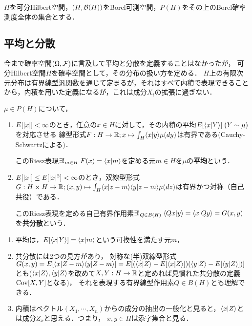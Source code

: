 \documentclass[uplatex,dvipdfmx]{jsreport}
\begin{document}
\begin{notation}
    $H$を可分Hilbert空間，$(H,\mathcal{B}(H))$をBorel可測空間，$P(H)$をその上のBorel確率測度全体の集合とする．
\end{notation}

\subsection{平均と分散}

\begin{tcolorbox}[colframe=ForestGreen, colback=ForestGreen!10!white,breakable,colbacktitle=ForestGreen!40!white,coltitle=black,fonttitle=\bfseries\sffamily,
title=]
    今まで確率空間$(\Omega,\mathcal{F})$に言及して平均と分散を定義することはなかったが，
    可分Hilbert空間$H$を確率空間として，その分布の扱い方を定める．
    $H$上の有限次元分布は有界線型汎関数を通じて定まるが，それはすべて内積で表現できることから，内積を用いた定義になるが，これは成分$X_i$の拡張に過ぎない．
\end{tcolorbox}

\begin{definition}
    $\mu\in P(H)$について，
    \begin{enumerate}
        \item $E[\lvert x\rvert]<\infty$のとき，任意の$x\in H$に対して，その内積の平均$E[\langle x|Y\rangle]\;(Y\sim\mu)$を対応させる
        線型形式$F:H\to\mathbb{R};x\mapsto\int_H\langle x|y\rangle\mu(dy)$は有界である(Cauchy-Schwartzによる)．
        
        このRiesz表現$\exists!_{m\in H}\;F(x)=\langle x|m\rangle$を定める元$m\in H$を$\mu$の\textbf{平均}という．
        \item $E[\lvert x\rvert]\le E[\lvert x\rvert^2]<\infty$のとき，双線型形式$G:H\times H\to\mathbb{R};(x,y)\mapsto\int_H\langle x|z-m\rangle\langle y|z-m\rangle\mu(dz)$は有界かつ対称（自己共役）である．
        
        このRiesz表現を定める自己有界作用素$\exists!_{Q\in B(H)}\;\langle Qx|y\rangle=\langle x|Qy\rangle=G(x,y)$を\textbf{共分散}という．
    \end{enumerate}
\end{definition}
\begin{remarks}\mbox{}
    \begin{enumerate}
        \item 平均は，$E[\langle x|Y\rangle]=\langle x|m\rangle$という可換性を満たす元$m$，
        \item 共分散には2つの見方があり，
        対称な(半)双線型形式$G(x,y)=E[\langle x|Z-m\rangle\langle y|Z-m\rangle]=E[(\langle x|Z\rangle-E[\langle x|Z\rangle])(\langle y|Z\rangle-E[\langle y|Z\rangle])]$とも($\langle x|Z\rangle,\langle y|Z\rangle$を改めて$X,Y:H\to\mathbb{R}$と定めれば見慣れた共分散の定義$\mathrm{Cov}[X,Y]$となる)，
        それを表現する有界線型作用素$Q\in B(H)$とも理解できる．
        \item 内積はベクトル$(X_1,\cdots,X_n)$からの成分の抽出の一般化と見ると，$\langle x|Z\rangle$とは成分$Z_x$と思える．つまり，
        $x,y\in H$は添字集合と見る．
    \end{enumerate}
\end{remarks}
\end{document}
